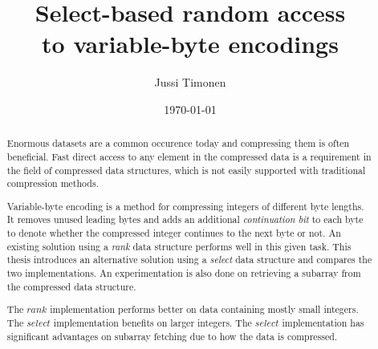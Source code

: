 \documentclass[english,twoside,censored,cs,alko-line]{HYthesisML}
\title{Select-based random access \\ to variable-byte encodings}
\author{Jussi Timonen}
\date{\today}
\begin{document}
\maketitle



\begin{abstract}

Enormous datasets are a common occurence today and compressing them is often beneficial. Fast direct access to any element in the compressed data is a requirement in the field of compressed 
data structures, which is not easily supported with traditional compression methods.

Variable-byte encoding is a method for compressing integers of different byte lengths. It removes unused leading bytes and adds an additional \textit{continuation bit} to each byte to 
denote whether the compressed integer continues to the next byte or not. An existing solution using a \textit{rank} data structure performs well in this given task. This thesis introduces an 
alternative solution using a \textit{select} data structure and compares the two implementations. An experimentation is also done on retrieving a subarray from the compressed data structure.

The $rank$ implementation performs better on data containing mostly small integers. The $select$ implementation benefits on larger integers. The $select$ implementation has significant 
advantages on subarray fetching due to how the data is compressed.

\end{abstract}


\newpage
\mytableofcontents
\frontmatter

\end{document}
